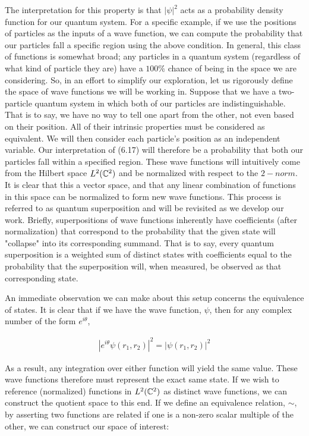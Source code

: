 The interpretation for this property is that $|\psi|^2$ acts as a probability density function for our quantum system. For a specific example, if we use the positions of particles as the inputs of a wave function, we can compute the probability that our particles fall a specific region using the above condition. In general, this class of functions is somewhat broad; any particles in a quantum system (regardless of what kind of particle they are) have a $100\%$ chance of being in the space we are considering. So, in an effort to simplify our exploration, let us rigorously define the space of wave functions we will be working in. Suppose that we have a two-particle quantum system in which both of our particles are indistinguishable. That is to say, we have no way to tell one apart from the other, not even based on their position. All of their intrinsic properties must be considered as equivalent. We will then consider each particle's position as an independent variable. Our interpretation of (6.17) will therefore be a probability that both our particles fall within a specified region. These wave functions will intuitively come from the Hilbert space $L^2(\mathbb{C}^2)$ and be normalized with respect to the $2-norm$. It is clear that this a vector space, and that any linear combination of functions in this space can be normalized to form new wave functions. This process is referred to as quantum superposition and will be revisited as we develop our work. Briefly, superpositions of wave functions inherently have coefficients (after normalization) that correspond to the probability that the given state will "collapse" into its corresponding summand. That is to say, every quantum superposition is a weighted sum of distinct states with coefficients equal to the probability that the superposition will, when measured, be observed as that corresponding state.

An immediate observation we can make about this setup concerns the equivalence of states. It is clear that if we have the wave function, $\psi$, then for any complex number of the form $e^{i\theta}$,

\begin{equation}
	\begin{aligned}
		|e^{i\theta}\psi(r_1,r_2)|^2 = |\psi(r_1,r_2)|^2 
	\end{aligned}
\end{equation}

As a result, any integration over either function will yield the same value. These wave functions therefore must represent the exact same state. If we wish to reference (normalized) functions in $L^2(\mathbb{C}^2)$ as distinct wave functions, we can construct the quotient space to this end. If we define an equivalence relation, $\sim$, by asserting two functions are related if one is a non-zero scalar multiple of the other, we can construct our space of interest:

